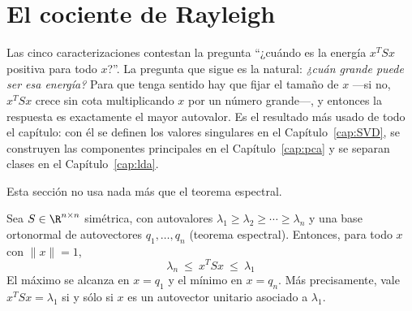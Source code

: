 \section{El cociente de Rayleigh}
\label{sec:rayleigh}

Las cinco caracterizaciones contestan la pregunta ``¿cuándo es la energía
$x^TSx$ positiva para todo $x$?''. La pregunta que sigue es la natural:
\emph{¿cuán grande puede ser esa energía?} Para que tenga sentido hay que
fijar el tamaño de $x$ ---si no, $x^TSx$ crece sin cota multiplicando $x$ por
un número grande---, y entonces la respuesta es exactamente el mayor
autovalor. Es el resultado más usado de todo el capítulo: con él se definen
los valores singulares en el Capítulo~\ref{cap:SVD}, se construyen las
componentes principales en el Capítulo~\ref{cap:pca} y se separan clases en el
Capítulo~\ref{cap:lda}.

Esta sección no usa nada más que el teorema espectral.

\begin{theorem}\label{teo:rayleigh}
Sea $S\in\R^{n\times n}$ simétrica, con autovalores
$\lambda_1\ge\lambda_2\ge\cdots\ge\lambda_n$ y una base ortonormal de
autovectores $q_1,\dots,q_n$ (teorema espectral). Entonces, para todo $x$ con
$\|x\|=1$,
\[
\boxed{\ \lambda_n\ \le\ x^TSx\ \le\ \lambda_1\ }
\]
El máximo se alcanza en $x=q_1$ y el mínimo en $x=q_n$. Más precisamente, vale
$x^TSx=\lambda_1$ si y sólo si $x$ es un autovector unitario asociado a
$\lambda_1$.
\end{theorem}

